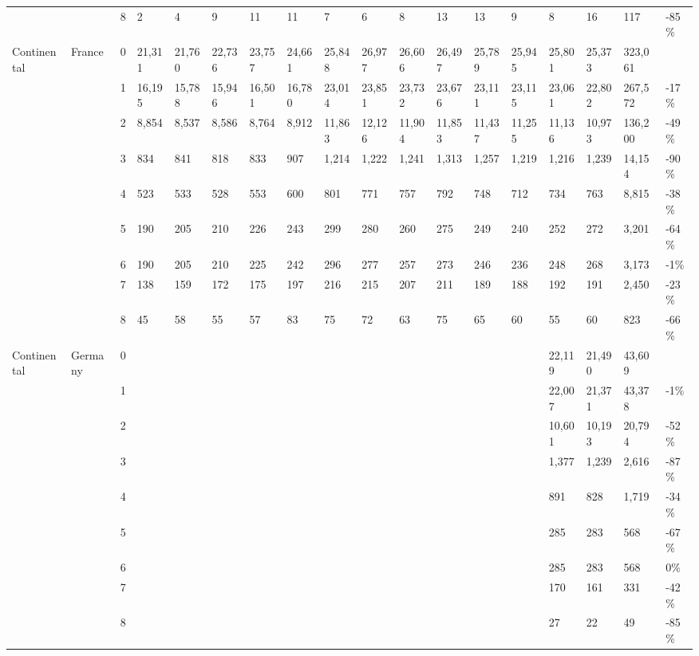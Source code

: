 \begin{longtable}{llllllllllllllllll}
   &  & 8 & 2 & 4 & 9 & 11 & 11 & 7 & 6 & 8 & 13 & 13 & 9 & 8 & 16 & 117 & -85\% \\ 
  Continental & France & 0 & 21,311 & 21,760 & 22,736 & 23,757 & 24,661 & 25,848 & 26,977 & 26,606 & 26,497 & 25,789 & 25,945 & 25,801 & 25,373 & 323,061 &  \\ 
   &  & 1 & 16,195 & 15,788 & 15,946 & 16,501 & 16,780 & 23,014 & 23,851 & 23,732 & 23,676 & 23,111 & 23,115 & 23,061 & 22,802 & 267,572 & -17\% \\ 
   &  & 2 & 8,854 & 8,537 & 8,586 & 8,764 & 8,912 & 11,863 & 12,126 & 11,904 & 11,853 & 11,437 & 11,255 & 11,136 & 10,973 & 136,200 & -49\% \\ 
   &  & 3 & 834 & 841 & 818 & 833 & 907 & 1,214 & 1,222 & 1,241 & 1,313 & 1,257 & 1,219 & 1,216 & 1,239 & 14,154 & -90\% \\ 
   &  & 4 & 523 & 533 & 528 & 553 & 600 & 801 & 771 & 757 & 792 & 748 & 712 & 734 & 763 & 8,815 & -38\% \\ 
   &  & 5 & 190 & 205 & 210 & 226 & 243 & 299 & 280 & 260 & 275 & 249 & 240 & 252 & 272 & 3,201 & -64\% \\ 
   &  & 6 & 190 & 205 & 210 & 225 & 242 & 296 & 277 & 257 & 273 & 246 & 236 & 248 & 268 & 3,173 & -1\% \\ 
   &  & 7 & 138 & 159 & 172 & 175 & 197 & 216 & 215 & 207 & 211 & 189 & 188 & 192 & 191 & 2,450 & -23\% \\ 
   &  & 8 & 45 & 58 & 55 & 57 & 83 & 75 & 72 & 63 & 75 & 65 & 60 & 55 & 60 & 823 & -66\% \\ 
  Continental & Germany & 0 &  &  &  &  &  &  &  &  &  &  &  & 22,119 & 21,490 & 43,609 &  \\ 
   &  & 1 &  &  &  &  &  &  &  &  &  &  &  & 22,007 & 21,371 & 43,378 & -1\% \\ 
   &  & 2 &  &  &  &  &  &  &  &  &  &  &  & 10,601 & 10,193 & 20,794 & -52\% \\ 
   &  & 3 &  &  &  &  &  &  &  &  &  &  &  & 1,377 & 1,239 & 2,616 & -87\% \\ 
   &  & 4 &  &  &  &  &  &  &  &  &  &  &  & 891 & 828 & 1,719 & -34\% \\ 
   &  & 5 &  &  &  &  &  &  &  &  &  &  &  & 285 & 283 & 568 & -67\% \\ 
   &  & 6 &  &  &  &  &  &  &  &  &  &  &  & 285 & 283 & 568 & 0\% \\ 
   &  & 7 &  &  &  &  &  &  &  &  &  &  &  & 170 & 161 & 331 & -42\% \\ 
   &  & 8 &  &  &  &  &  &  &  &  &  &  &  & 27 & 22 & 49 & -85\% \\ 

\end{longtable}
